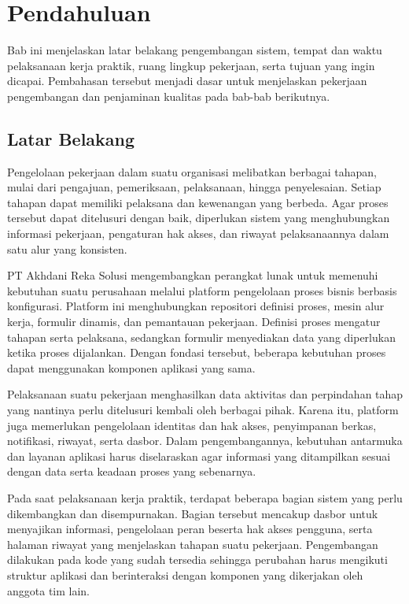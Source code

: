 \chapter{Pendahuluan}
Bab ini menjelaskan latar belakang pengembangan sistem, tempat dan waktu pelaksanaan kerja praktik, ruang lingkup pekerjaan, serta tujuan yang ingin dicapai. Pembahasan tersebut menjadi dasar untuk menjelaskan pekerjaan pengembangan dan penjaminan kualitas pada bab-bab berikutnya.

\section{Latar Belakang}\label{sec:latar}
Pengelolaan pekerjaan dalam suatu organisasi melibatkan berbagai tahapan, mulai dari pengajuan, pemeriksaan, pelaksanaan, hingga penyelesaian. Setiap tahapan dapat memiliki pelaksana dan kewenangan yang berbeda. Agar proses tersebut dapat ditelusuri dengan baik, diperlukan sistem yang menghubungkan informasi pekerjaan, pengaturan hak akses, dan riwayat pelaksanaannya dalam satu alur yang konsisten.

PT Akhdani Reka Solusi mengembangkan perangkat lunak untuk memenuhi kebutuhan suatu perusahaan melalui platform pengelolaan proses bisnis berbasis konfigurasi. Platform ini menghubungkan repositori definisi proses, mesin alur kerja, formulir dinamis, dan pemantauan pekerjaan. Definisi proses mengatur tahapan serta pelaksana, sedangkan formulir menyediakan data yang diperlukan ketika proses dijalankan. Dengan fondasi tersebut, beberapa kebutuhan proses dapat menggunakan komponen aplikasi yang sama.

Pelaksanaan suatu pekerjaan menghasilkan data aktivitas dan perpindahan tahap yang nantinya perlu ditelusuri kembali oleh berbagai pihak. Karena itu, platform juga memerlukan pengelolaan identitas dan hak akses, penyimpanan berkas, notifikasi, riwayat, serta dasbor. Dalam pengembangannya, kebutuhan antarmuka dan layanan aplikasi harus diselaraskan agar informasi yang ditampilkan sesuai dengan data serta keadaan proses yang sebenarnya.

Pada saat pelaksanaan kerja praktik, terdapat beberapa bagian sistem yang perlu dikembangkan dan disempurnakan. Bagian tersebut mencakup dasbor untuk menyajikan informasi, pengelolaan peran beserta hak akses pengguna, serta halaman riwayat yang menjelaskan tahapan suatu pekerjaan. Pengembangan dilakukan pada kode yang sudah tersedia sehingga perubahan harus mengikuti struktur aplikasi dan berinteraksi dengan komponen yang dikerjakan oleh anggota tim lain.

